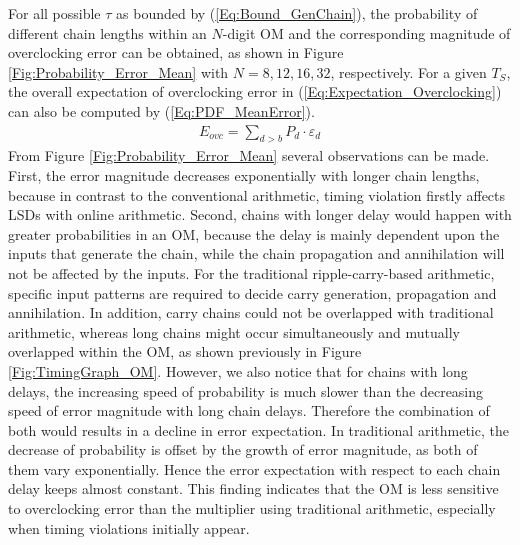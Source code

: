 \documentclass{acm_proc_article-sp}
\begin{document}
For all possible $\tau$ as bounded by (\ref{Eq:Bound_GenChain}), the probability of different chain lengths within an $N$-digit OM and the corresponding magnitude of overclocking error can be obtained, as shown in Figure \ref{Fig:Probability_Error_Mean} with $N=8,12,16,32$, respectively. For a given $T_S$, the overall expectation of overclocking error in (\ref{Eq:Expectation_Overclocking}) can also be computed by (\ref{Eq:PDF_MeanError}).
%
\begin{eqnarray}\label{Eq:PDF_MeanError}
  E_{ovc}=\sum_{d>b}P_d\cdot\varepsilon_d
\end{eqnarray}
%
From Figure \ref{Fig:Probability_Error_Mean} several observations can be made. First, the error magnitude decreases exponentially with longer chain lengths, because in contrast to the conventional arithmetic, timing violation firstly affects LSDs with online arithmetic. Second, chains with longer delay would happen with greater probabilities in an OM, because the delay is mainly dependent upon the inputs that generate the chain, while the chain propagation and annihilation will not be affected by the inputs. For the traditional ripple-carry-based arithmetic, specific input patterns are required to decide carry generation, propagation and annihilation. In addition, carry chains could not be overlapped with traditional arithmetic, whereas long chains might occur simultaneously and mutually overlapped within the OM, as shown previously in Figure \ref{Fig:TimingGraph_OM}. However, we also notice that for chains with long delays, the increasing speed of probability is much slower than the decreasing speed of error magnitude with long chain delays. Therefore the combination of both would results in a decline in error expectation. In traditional arithmetic, the decrease of probability is offset by the growth of error magnitude, as both of them vary exponentially. Hence the error expectation with respect to each chain delay keeps almost constant. This finding indicates that the OM is less sensitive to overclocking error than the multiplier using traditional arithmetic, especially when timing violations initially appear.
\end{document}
